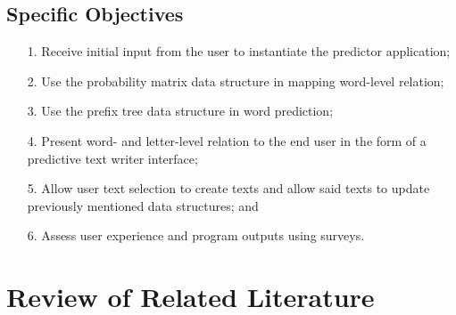 \documentclass[journal]{./IEEE/IEEEtran}
\begin{document}
\subsection{Specific Objectives}
\begin{enumerate}{}

\item[1.] Receive initial input from the user to instantiate the predictor application;

\item[2.] Use the probability matrix data structure in mapping word-level relation;

\item[3.] Use the prefix tree data structure in word prediction;

\item[4.] Present word- and letter-level relation to the end user in the form of a predictive text writer interface;

\item[5.] Allow user text selection to create texts and allow said texts to update previously mentioned data structures; and

\item[6.] Assess user experience and program outputs using surveys.

\end{enumerate}

\section{Review of Related Literature}




\end{document}

